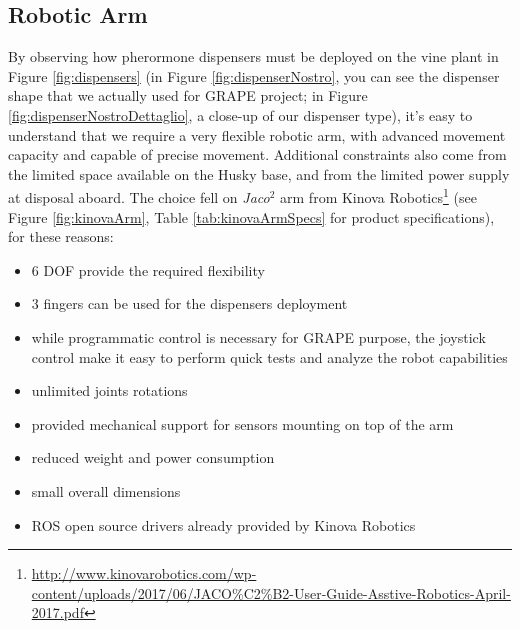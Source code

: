 \subsection{Robotic Arm}\label{subsec:kinovaArm}
By observing how pherormone dispensers must be deployed on the vine plant in Figure \ref{fig:dispensers} (in Figure \ref{fig:dispenserNostro}, you can see the dispenser shape that we actually used for \ac{GRAPE} project; in Figure \ref{fig:dispenserNostroDettaglio}, a close-up of our dispenser type), it's easy to understand that we require a very flexible robotic arm, with advanced movement capacity and capable of precise movement. Additional constraints also come from the limited space available on the Husky base, and from the limited power supply at disposal aboard. The choice fell on \textit{Jaco$^2$} arm from Kinova Robotics\footnote{\url{http://www.kinovarobotics.com/wp-content/uploads/2017/06/JACO\%C2\%B2-User-Guide-Asstive-Robotics-April-2017.pdf}}
(see Figure \ref{fig:kinovaArm}, Table \ref{tab:kinovaArmSpecs} for product specifications), for these reasons:
\begin{itemize}
	\item 6 DOF provide the required flexibility
	\item 3 fingers can be used for the dispensers deployment
	\item while programmatic control is necessary for \ac{GRAPE} purpose, the joystick control make it easy to perform quick tests and analyze the robot capabilities
	\item unlimited joints rotations
	\item provided mechanical support for sensors mounting on top of the arm 
	\item reduced weight and power consumption
	\item small overall dimensions
	\item \ac{ROS} open source drivers already provided by Kinova Robotics
\end{itemize}


